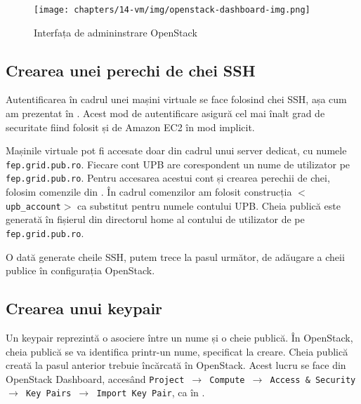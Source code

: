\begin{figure}[!htbp]
	\centering
	\texttt{[image: chapters/14-vm/img/openstack-dashboard-img.png]}
	\caption{Interfața de admininstrare OpenStack}
	\label{fig:vm:openstack-dashboard}
\end{figure}

\subsection{Crearea unei perechi de chei SSH}
\label{sec:vm:upb-openstack:keys}

Autentificarea în cadrul unei mașini virtuale se face folosind chei SSH, așa cum am prezentat în . Acest mod de autentificare asigură cel mai înalt grad de securitate fiind folosit și de Amazon EC2 în mod implicit.

Mașinile virtuale pot fi accesate doar din cadrul unui server dedicat, cu numele \texttt{fep.grid.pub.ro}.
Fiecare cont UPB are corespondent un nume de utilizator pe \texttt{fep.grid.pub.ro}.
Pentru accesarea acestui cont și crearea perechii de chei, folosim comenzile din .
În cadrul comenzilor am folosit construcția \texttt{$<$upb\_account$>$} ca substitut pentru numele contului UPB.
Cheia publică este generată în fișierul  din directorul home al contului de utilizator de pe \texttt{fep.grid.pub.ro}.


O dată generate cheile SSH, putem trece la pasul următor, de adăugare a cheii publice în configurația OpenStack.

\subsection{Crearea unui keypair}
\label{sec:vm:upb-openstack:keypares}

Un keypair reprezintă o asociere între un nume și o cheie publică. În OpenStack,
cheia publică se va identifica printr-un nume, specificat la creare. Cheia
publică creată la pasul anterior trebuie încărcată în OpenStack. Acest lucru se
face din OpenStack Dashboard, accesând \texttt{Project $\rightarrow$ Compute $\rightarrow$ Access \& Security $\rightarrow$ Key Pairs $\rightarrow$ Import Key Pair}, ca în .

